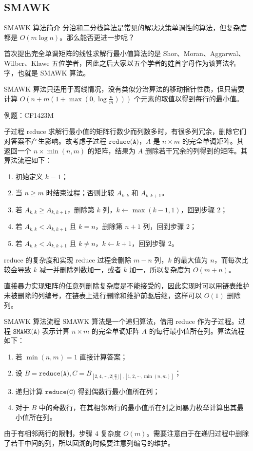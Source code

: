 \documentclass{beamer}
\begin{document}
\subsection{SMAWK}
\begin{frame}{SMAWK 算法简介}
	分治和二分栈算法是常见的解决决策单调性的算法，但复杂度都是 $O(m \log n)$。那么能否更进一步呢？
	
	首次提出完全单调矩阵的线性求解行最小值算法的是 Shor、Moran、Aggarwal、Wilber、Klawe 五位学者，因此之后大家以五个学者的姓首字母作为该算法名字，也就是 SMAWK 算法。
	
	SMAWK 算法只适用于离线情况，没有类似分治算法的移动指针性质，但只需要计算 $O(n+m(1+ \max(0,\log \frac{n}{m})))$ 个元素的取值以得到每行的最小值。
	
	例题：CF1423M 
\end{frame}
\begin{frame}{子过程 reduce}
	求解行最小值的矩阵行数少而列数多时，有很多列冗余，删除它们对答案不产生影响。故考虑子过程 $\texttt{reduce(A)}$，$A$ 是 $n \times m$ 的完全单调矩阵。其返回一个 $n \times \min(n,m)$ 的矩阵，结果为 $A$ 删除若干冗余的列得到的矩阵。其算法流程如下：
	\begin{enumerate}
		\item 初始定义 $k = 1$；
		\item 当 $n \geq m$ 时结束过程；否则比较 $A_{k,k}$ 和 $A_{k,k+1}$。
		\item 若 $A_{k,k} \geq A_{k,k+1}$，删除第 $k$ 列，$k \leftarrow \max(k-1,1)$，回到步骤 2；
		\item 若 $A_{k,k} < A_{k,k+1}$ 且 $k=n$，删除第 $n+1$ 列，回到步骤 2；
		\item 若 $A_{k,k} < A_{k,k+1}$ 且 $k \neq n$，$k \leftarrow k+1$，回到步骤 2。
	\end{enumerate}
\end{frame}
\begin{frame}{reduce 的复杂度和实现}
	reduce 过程会删除 $m-n$ 列，$k$ 的最大值为 $n$，而每次比较会导致 $k$ 减一并删除列数加一，或者 $k$ 加一，所以复杂度为 $O(m+n)$。
	
	直接暴力实现矩阵的任意列删除复杂度是不能接受的，因此实现时可以用链表维护未被删除的列编号，在链表上进行删除和维护前驱后继，这样可以 $O(1)$ 删除列。
\end{frame}
\begin{frame}{SMAWK 算法流程}
	SMAWK 算法是一个递归算法，借用 reduce 作为子过程。过程 $\texttt{SMAWK(A)}$ 表示计算 $n \times m$ 的完全单调矩阵 $A$ 的每行最小值所在列。算法流程如下：
	\begin{enumerate}
		\item 若 $\min(n,m) = 1$ 直接计算答案；
		\item 设 $B = \texttt{reduce(A)},C = B_{[2,4,\cdots,2\lfloor \frac{n}{2} \rfloor] , [1,2,\cdots,\min(n,m)]}$；
		\item 递归计算 $\texttt{reduce(C)}$ 得到偶数行最小值所在列；
		\item 对于 $B$ 中的奇数行，在其相邻两行的最小值所在列之间暴力枚举计算出其最小值所在列。
	\end{enumerate}
	由于有相邻两行的限制，步骤 4 复杂度 $O(m)$。需要注意由于在递归过程中删除了若干中间的列，所以回溯的时候要注意列编号的维护。
\end{frame}
\end{document}
